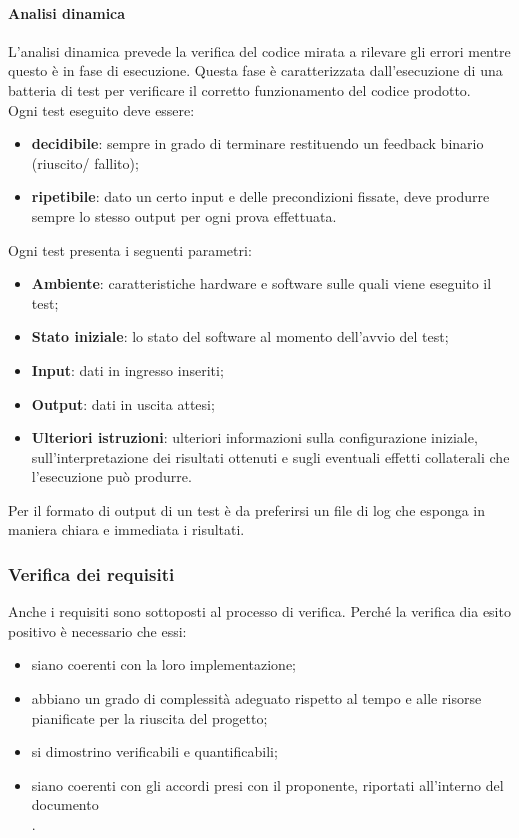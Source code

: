 \paragraph{Analisi dinamica}
L'analisi dinamica prevede la verifica del codice mirata a rilevare gli errori mentre questo è in fase di esecuzione.  Questa fase è caratterizzata dall'esecuzione di una batteria di test per verificare il corretto funzionamento del codice prodotto.\\
Ogni test eseguito deve essere:
\begin{itemize}
    \item \textbf{decidibile}: sempre in grado di terminare restituendo un feedback binario (riuscito/ fallito);
    \item \textbf{ripetibile}: dato un certo input e delle precondizioni fissate, deve produrre sempre lo stesso output per ogni prova effettuata.
\end{itemize}
Ogni test presenta i seguenti parametri:
\begin{itemize}
    \item \textbf{Ambiente}: caratteristiche hardware e software sulle quali viene eseguito il test;
    \item \textbf{Stato iniziale}: lo stato del software al momento dell'avvio del test;
    \item \textbf{Input}: dati in ingresso inseriti;
    \item \textbf{Output}: dati in uscita attesi;
    \item \textbf{Ulteriori istruzioni}: ulteriori informazioni sulla configurazione iniziale, sull'interpretazione dei risultati ottenuti e sugli eventuali effetti collaterali che l'esecuzione può produrre.
\end{itemize}
Per il formato di output di un test è da preferirsi un file di log che esponga in maniera chiara e immediata i risultati.

\subsubsection{Verifica dei requisiti}
Anche i requisiti sono sottoposti al processo di verifica. Perché la verifica dia esito positivo è necessario che essi:

\begin{itemize}
    \item siano coerenti con la loro implementazione;
    \item abbiano un grado di complessità adeguato rispetto al tempo e alle risorse pianificate per la riuscita del progetto;
    \item si dimostrino verificabili e quantificabili;
    \item siano coerenti con gli accordi presi con il proponente, riportati all'interno del documento \\.
\end{itemize}

